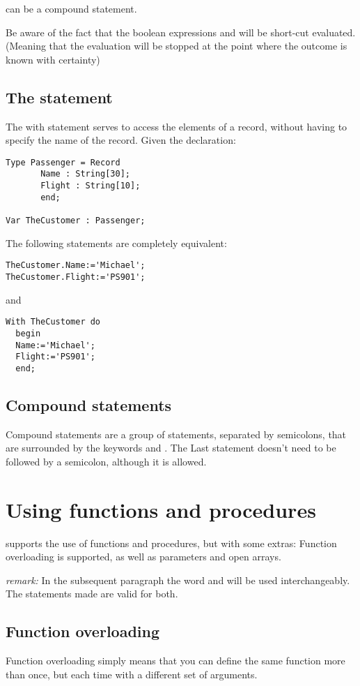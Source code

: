 \documentclass{report}
\begin{document}
 can be a compound statement.

Be aware of the fact that the boolean expressions  and
 will be short-cut evaluated. (Meaning that the evaluation
will be stopped at the point where the outcome is known with certainty)

\subsection{The  statement}
The with statement serves to access the elements of a record, without
having to specify the name of the record. Given the declaration:
\begin{verbatim}
Type Passenger = Record
       Name : String[30];
       Flight : String[10];
       end;

Var TheCustomer : Passenger;
\end{verbatim}
The following statements are completely equivalent:
\begin{verbatim}
TheCustomer.Name:='Michael';
TheCustomer.Flight:='PS901';
\end{verbatim}
and
\begin{verbatim}
With TheCustomer do
  begin
  Name:='Michael';
  Flight:='PS901';
  end;
\end{verbatim}
 
\subsection{Compound statements}
Compound statements are a group of statements, separated by semicolons, 
that are surrounded by the keywords  and . The
Last statement doesn't need to be followed by a semicolon, although it is
allowed.

\section{Using functions and procedures}
\fpc supports the use of functions and procedures, but with some extras:
Function overloading is supported, as well as  parameters and
open arrays.

{\em remark:} In the subsequent paragraph the word  and
 will be used interchangeably. The statements made are
valid for both.

\subsection{Function overloading}
Function overloading simply means that you can define the same function more
than once, but each time with a different set of arguments.
\end{document}

